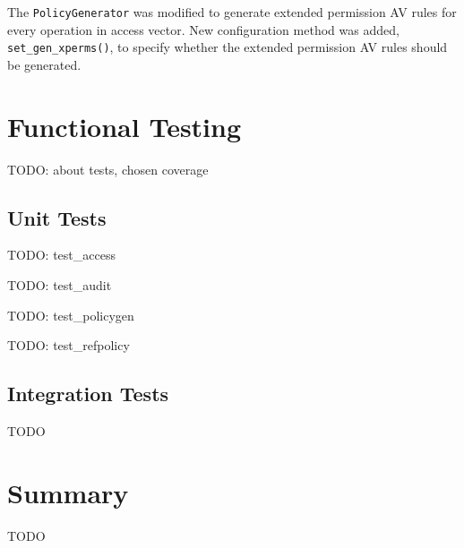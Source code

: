 The \texttt{PolicyGenerator} was modified to generate extended permission AV
rules for every operation in access vector. New configuration method was added,
\texttt{set\_gen\_xperms()}, to specify whether the extended permission AV rules
should be generated.

\chapter{Functional Testing}
TODO: about tests, chosen coverage

\section{Unit Tests}

TODO: test\_access

TODO: test\_audit

TODO: test\_policygen

TODO: test\_refpolicy

\section{Integration Tests}

TODO

\chapter{Summary}
TODO

